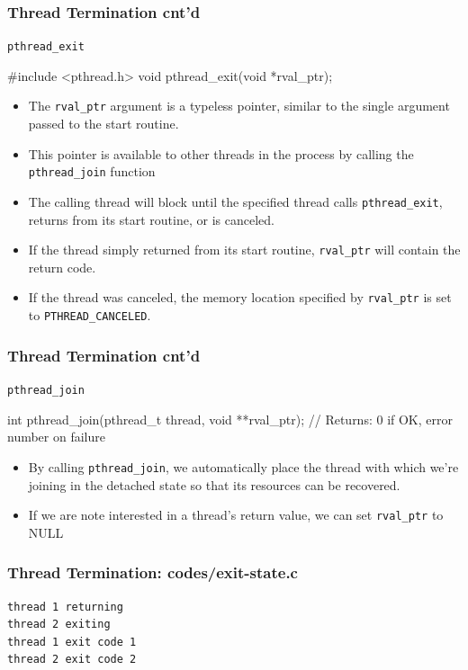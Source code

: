 \documentclass[newPxFont,sthlmFooter,nooffset]{beamer}
\begin{document}
\begin{frame}[fragile, t]
  \frametitle{Thread Termination cnt'd}
 \texttt{pthread\_exit}
\begin{codedef}
#include <pthread.h>
void pthread_exit(void *rval_ptr);
\end{codedef}

{\footnotesize
 \begin{itemize}
 \item The \texttt{rval\_ptr} argument is a typeless pointer, similar
   to the single argument passed to the start routine.
 \item This pointer is
   available to other threads in the process by calling the
   \texttt{pthread\_join} function
 \item The calling thread will block until the specified thread calls \texttt{pthread\_exit}, returns from its start routine, or is canceled.
 \item If the thread simply returned from its start routine, \texttt{rval\_ptr} will contain the return code.
 \item If the thread was canceled, the memory location specified by \texttt{rval\_ptr} is set to \texttt{PTHREAD\_CANCELED}.
 \end{itemize}
}

\end{frame}

\begin{frame}[fragile, t]
  \frametitle{Thread Termination cnt'd}
 \texttt{pthread\_join}
\begin{codedef}
int pthread_join(pthread_t thread, void **rval_ptr);
// Returns: 0 if OK, error number on failure
\end{codedef}

{\footnotesize
 \begin{itemize}
 \item By calling \texttt{pthread\_join}, we automatically place the thread with which we’re joining in the detached state so that its resources can be recovered.
 \item If we are note interested in a thread's return value, we can set \texttt{rval\_ptr} to NULL
 \end{itemize}
}

\end{frame}



\begin{frame}
  \frametitle{Thread Termination: codes/exit-state.c}

  

\begin{verbatim}
thread 1 returning
thread 2 exiting
thread 1 exit code 1
thread 2 exit code 2
\end{verbatim}

\end{frame}
\end{document}
